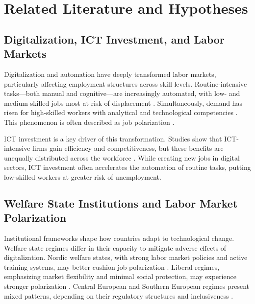 
\section{Related Literature and Hypotheses}

\subsection{Digitalization, ICT Investment, and Labor Markets}

Digitalization and automation have deeply transformed labor markets, particularly affecting 
employment structures across skill levels. Routine-intensive tasks—both manual and cognitive—are 
increasingly automated, with low- and medium-skilled jobs most at risk of displacement 
\parencite{frey2013thefuture, goos2014explaining}. Simultaneously, demand has risen for 
high-skilled workers with analytical and technological competencies 
\parencite{autor2013thegrowth}. This phenomenon is often described as job polarization 
\parencite{autor2015whyare}.

ICT investment is a key driver of this transformation. Studies show that ICT-intensive firms gain 
efficiency and competitiveness, but these benefits are unequally distributed across the workforce 
\parencite{corrado2018intangible, brynjolfsson2014thesecond}. While creating new jobs in digital 
sectors, ICT investment often accelerates the automation of routine tasks, putting low-skilled 
workers at greater risk of unemployment.

\subsection{Welfare State Institutions and Labor Market Polarization}

Institutional frameworks shape how countries adapt to technological change. Welfare state regimes 
differ in their capacity to mitigate adverse effects of digitalization. Nordic welfare states, 
with strong labor market policies and active training systems, may better cushion job 
polarization \parencite{espingandersen1990thethree}. Liberal regimes, emphasizing market 
flexibility and minimal social protection, may experience stronger polarization 
\parencite{hall2001varieties}. Central European and Southern European regimes present mixed 
patterns, depending on their regulatory structures and inclusiveness 
\parencite{ferrera1996thesouthern}.

